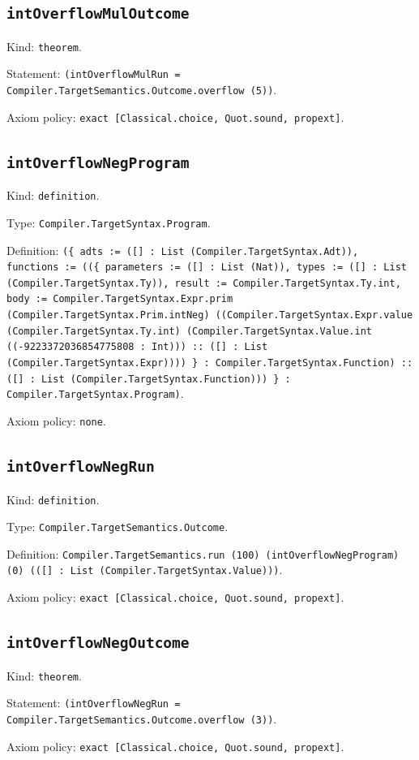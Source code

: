 \documentclass[11pt]{article}
\begin{document}
\subsection*{\texttt{intOverflowMulOutcome}}
\noindent Kind: \texttt{theorem}.\par
\noindent Statement: \texttt{(intOverflowMulRun = Compiler.TargetSemantics.Outcome.overflow (5))}.\par
\noindent Axiom policy: \texttt{exact [Classical.choice, Quot.sound, propext]}.\par
\subsection*{\texttt{intOverflowNegProgram}}
\noindent Kind: \texttt{definition}.\par
\noindent Type: \texttt{Compiler.TargetSyntax.Program}.\par
\noindent Definition: \texttt{(\{ adts := ([] : List (Compiler.TargetSyntax.Adt)), functions := ((\{ parameters := ([] : List (Nat)), types := ([] : List (Compiler.TargetSyntax.Ty)), result := Compiler.TargetSyntax.Ty.int, body := Compiler.TargetSyntax.Expr.prim (Compiler.TargetSyntax.Prim.intNeg) ((Compiler.TargetSyntax.Expr.value (Compiler.TargetSyntax.Ty.int) (Compiler.TargetSyntax.Value.int ((-9223372036854775808 : Int))) :: ([] : List (Compiler.TargetSyntax.Expr)))) \} : Compiler.TargetSyntax.Function) :: ([] : List (Compiler.TargetSyntax.Function))) \} : Compiler.TargetSyntax.Program)}.\par
\noindent Axiom policy: \texttt{none}.\par
\subsection*{\texttt{intOverflowNegRun}}
\noindent Kind: \texttt{definition}.\par
\noindent Type: \texttt{Compiler.TargetSemantics.Outcome}.\par
\noindent Definition: \texttt{Compiler.TargetSemantics.run (100) (intOverflowNegProgram) (0) (([] : List (Compiler.TargetSyntax.Value)))}.\par
\noindent Axiom policy: \texttt{exact [Classical.choice, Quot.sound, propext]}.\par
\subsection*{\texttt{intOverflowNegOutcome}}
\noindent Kind: \texttt{theorem}.\par
\noindent Statement: \texttt{(intOverflowNegRun = Compiler.TargetSemantics.Outcome.overflow (3))}.\par
\noindent Axiom policy: \texttt{exact [Classical.choice, Quot.sound, propext]}.\par
\end{document}
